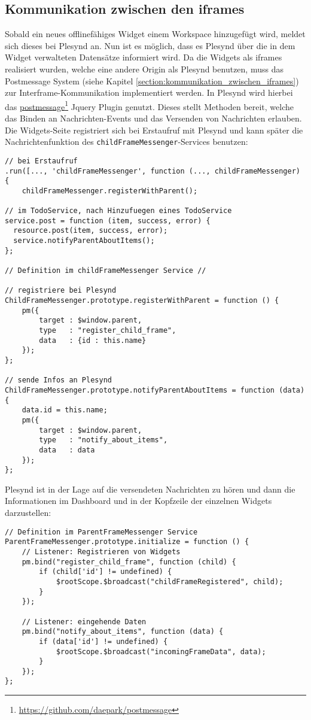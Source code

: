 \subsection{Kommunikation zwischen den iframes}
Sobald ein neues offlinefähiges Widget einem Workspace hinzugefügt wird, meldet sich dieses bei Plesynd an. Nun ist es möglich, dass es Plesynd über die in dem Widget verwalteten Datensätze informiert wird. Da die Widgets als iframes realisiert wurden, welche eine andere Origin als Plesynd benutzen, muss das Postmessage System (siehe Kapitel \ref{section:kommunikation_zwischen_iframes}) zur Interframe-Kommunikation implementiert werden. In Plesynd wird hierbei das \href{https://github.com/daepark/postmessage}{postmessage}\footnote{\url{https://github.com/daepark/postmessage}} Jquery Plugin genutzt. Dieses stellt Methoden bereit, welche das Binden an Nachrichten-Events und das Versenden von Nachrichten erlauben. Die Widgets-Seite registriert sich bei Erstaufruf mit Plesynd und kann später die Nachrichtenfunktion des \texttt{childFrameMessenger}-Services benutzen:
\begin{lstlisting}
// bei Erstaufruf
.run([..., 'childFrameMessenger', function (..., childFrameMessenger) {
    childFrameMessenger.registerWithParent();
    
// im TodoService, nach Hinzufuegen eines TodoService
service.post = function (item, success, error) {
  resource.post(item, success, error);
  service.notifyParentAboutItems();
};
   
// Definition im childFrameMessenger Service //

// registriere bei Plesynd
ChildFrameMessenger.prototype.registerWithParent = function () {
    pm({
        target : $window.parent,
        type   : "register_child_frame",
        data   : {id : this.name}
    });
};

// sende Infos an Plesynd
ChildFrameMessenger.prototype.notifyParentAboutItems = function (data) {
    data.id = this.name;
    pm({
        target : $window.parent,
        type   : "notify_about_items",
        data   : data
    });
};
\end{lstlisting}

Plesynd ist in der Lage auf die versendeten Nachrichten zu hören und dann die Informationen im Dashboard und in der Kopfzeile der einzelnen Widgets darzustellen:
\begin{lstlisting}
// Definition im ParentFrameMessenger Service
ParentFrameMessenger.prototype.initialize = function () {
    // Listener: Registrieren von Widgets
    pm.bind("register_child_frame", function (child) {
        if (child['id'] != undefined) {
            $rootScope.$broadcast("childFrameRegistered", child);
        }
    });

    // Listener: eingehende Daten
    pm.bind("notify_about_items", function (data) {
        if (data['id'] != undefined) {
            $rootScope.$broadcast("incomingFrameData", data);
        }
    });
};
\end{lstlisting}


